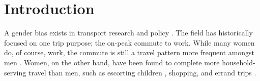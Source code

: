 \documentclass[
  authoryear,
  preprint,
  3p]{elsarticle}
\begin{document}
    \ifdefined\Shaded\renewenvironment{Shaded}{\begin{tcolorbox}[enhanced, frame hidden, borderline west={3pt}{0pt}{shadecolor}, boxrule=0pt, interior hidden, breakable, sharp corners]}{\end{tcolorbox}}\fi

\hypertarget{introduction}{%
\section{Introduction}\label{introduction}}

A gender bias exists in transport research and policy
\citep{sanchezdemadariagaMobilityCareIntroducing2013, lawWomenTransportNew1999, siemiatyckiGenderedProductionInfrastructure2020}.
The field has historically focused on one trip purpose; the on-peak
commute to work. While many women do, of course, work, the commute is
still a travel pattern more frequent amongst men
\citep{sanchezdemadariagaMobilityCareIntroducing2013}. Women, on the
other hand, have been found to complete more household-serving travel
than men, such as escorting children
\citep{craigGenderMobilityParental2019, taylorWhatExplainsGender2015, hanTaskAllocationGender2019, mcdonaldExploratoryAnalysisChildren2006},
shopping, and errand trips
\citep{taylorWhatExplainsGender2015, rootWomenTravelIdea2000, sweetGenderDifferencesRole2016}.
\end{document}
